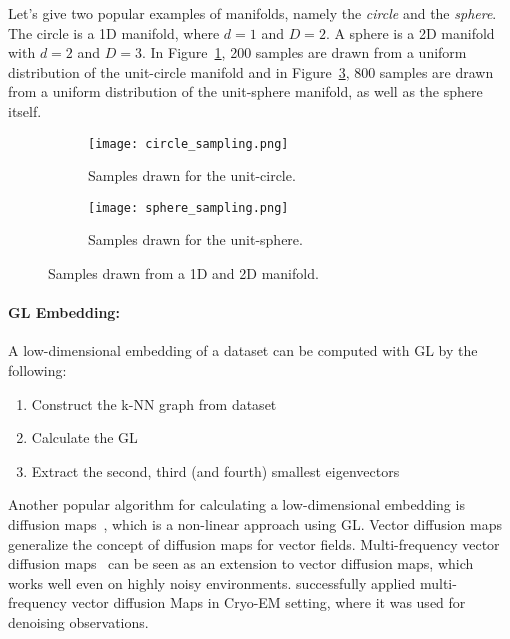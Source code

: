 Let's give two popular examples of manifolds, namely the \textit{circle} and the \textit{sphere}.
The circle is a 1D manifold, where $d=1$ and $D=2$. A sphere is a 2D manifold with $d=2$ and $D=3$.
In Figure~\ref{fig:circle_sampling}, 200 samples are drawn from a uniform distribution of the unit-circle manifold
and in Figure~\ref{fig:sphere_sampling}, 800 samples are drawn from a uniform distribution of the unit-sphere manifold,
as well as the sphere itself.



\begin{figure}[H]
    \captionsetup[subfigure]{justification=centering}
    \centering
    \begin{subfigure}[t]{0.4\textwidth}
        \texttt{[image: circle\_sampling.png]}
        \caption{Samples drawn for the unit-circle.}
        \label{fig:circle_sampling}
    \end{subfigure}\hfill
    \begin{subfigure}[t]{0.4\textwidth}
      \texttt{[image: sphere\_sampling.png]}
      \caption{Samples drawn for the unit-sphere.}
      \label{fig:sphere_sampling}
    \end{subfigure}\hfill
    \caption{Samples drawn from a 1D and 2D manifold.}
  \end{figure}


\paragraph{GL Embedding:}
\label{sec:manifold_calculation}
A low-dimensional embedding of a dataset can be computed with GL by the following:

\begin{enumerate}
    \item Construct the k-NN graph from dataset
    \item Calculate the GL
    \item Extract the second, third (and fourth) smallest eigenvectors
\end{enumerate}

Another popular algorithm for calculating a low-dimensional embedding is diffusion maps~\cite{diffusionMaps}, 
which is a non-linear approach using GL.
Vector diffusion maps~\cite{vectorDiffusionMaps} generalize the concept of diffusion maps for vector fields.
Multi-frequency vector diffusion maps~\cite{multiDiffusionMaps} 
can be seen as an extension to vector diffusion maps, which works well even on highly noisy environments.
\citet{cryoEmMutliDM} successfully applied multi-frequency vector diffusion Maps in Cryo-EM setting,
 where it was used for denoising observations.


